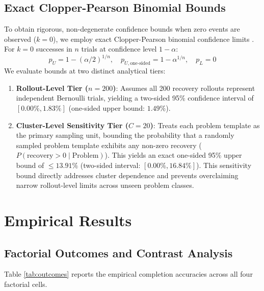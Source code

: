 \documentclass[11pt,letterpaper]{article}
\begin{document}
\subsection{Exact Clopper-Pearson Binomial Bounds}
To obtain rigorous, non-degenerate confidence bounds when zero events are observed ($k=0$), we employ exact Clopper-Pearson binomial confidence limits \cite{clopper1934use}. For $k=0$ successes in $n$ trials at confidence level $1 - \alpha$:
\begin{equation}
p_U = 1 - (\alpha/2)^{1/n}, \quad p_{U, \text{one-sided}} = 1 - \alpha^{1/n}, \quad p_L = 0
\end{equation}
We evaluate bounds at two distinct analytical tiers:
\begin{enumerate}
    \item \textbf{Rollout-Level Tier ($n=200$)}: Assumes all 200 recovery rollouts represent independent Bernoulli trials, yielding a two-sided 95\% confidence interval of $[0.00\%, 1.83\%]$ (one-sided upper bound: $1.49\%$).
    \item \textbf{Cluster-Level Sensitivity Tier ($C=20$)}: Treats each problem template as the primary sampling unit, bounding the probability that a randomly sampled problem template exhibits any non-zero recovery ($P(\text{recovery} > 0 \mid \text{Problem})$). This yields an exact one-sided 95\% upper bound of $\le 13.91\%$ (two-sided interval: $[0.00\%, 16.84\%]$). This sensitivity bound directly addresses cluster dependence and prevents overclaiming narrow rollout-level limits across unseen problem classes.
\end{enumerate}

\section{Empirical Results}

\subsection{Factorial Outcomes and Contrast Analysis}
Table \ref{tab:outcomes} reports the empirical completion accuracies across all four factorial cells.
\end{document}
